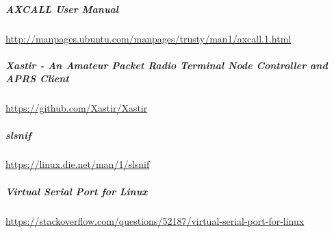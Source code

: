 \subparagraph{AXCALL User Manual}

\href{http://manpages.ubuntu.com/manpages/trusty/man1/axcall.1.html}{http://manpages.ubuntu.com/manpages/trusty/man1/axcall.1.html}

\subparagraph{Xastir - An Amateur Packet Radio Terminal Node Controller and APRS Client}

\href{https://github.com/Xastir/Xastir}{https://github.com/Xastir/Xastir}

\subparagraph{slsnif}

\href{https://linux.die.net/man/1/slsnif}{https://linux.die.net/man/1/slsnif}

\subparagraph{Virtual Serial Port for Linux}

\href{https://stackoverflow.com/questions/52187/virtual-serial-port-for-linux}{https://stackoverflow.com/questions/52187/virtual-serial-port-for-linux}